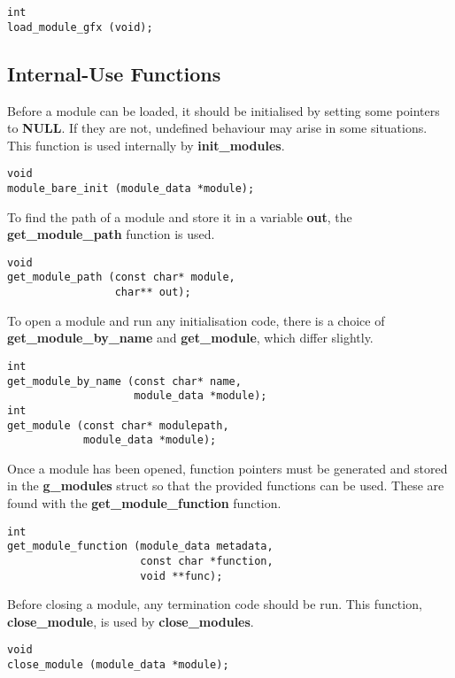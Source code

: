 \documentclass[12pt,a4paper]{article}
\begin{document}
\begin{lstlisting}
int
load_module_gfx (void);
\end{lstlisting}

\subsection{Internal-Use Functions}

Before a module can be loaded, it should be initialised by setting some pointers to \textbf{NULL}. If they are not, undefined behaviour may arise in some situations. This function is used internally by \textbf{init\_modules}.

\begin{lstlisting}
void
module_bare_init (module_data *module);
\end{lstlisting}

To find the path of a module and store it in a variable \textbf{out}, the \textbf{get\_module\_path} function is used.

\begin{lstlisting}
void
get_module_path (const char* module,
                 char** out);
\end{lstlisting}

To open a module and run any initialisation code, there is a choice of \textbf{get\_module\_by\_name} and \textbf{get\_module}, which differ slightly.

\begin{lstlisting}
int
get_module_by_name (const char* name,
                    module_data *module);
int
get_module (const char* modulepath,
            module_data *module);
\end{lstlisting}

Once a module has been opened, function pointers must be generated and stored in the \textbf{g\_modules} struct so that the provided functions can be used. These are found with the \textbf{get\_module\_function} function.

\begin{lstlisting}
int
get_module_function (module_data metadata,
                     const char *function,
                     void **func);
\end{lstlisting}

Before closing a module, any termination code should be run. This function, \textbf{close\_module}, is used by \textbf{close\_modules}.

\begin{lstlisting}
void
close_module (module_data *module);
\end{lstlisting}
\end{document}

